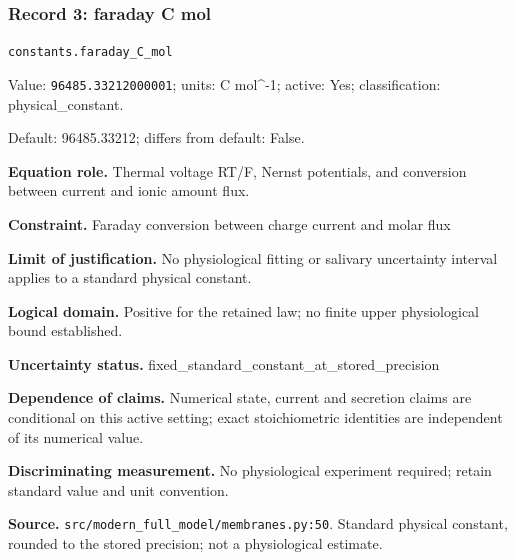 \subsubsection*{Record 3: faraday C mol}
{\small \nolinkurl{constants.faraday_C_mol}\par

Value: \texttt{96485.33212000001}; units: C mol\textasciicircum{}-1; active: Yes; classification: physical\_constant.\par

Default: 96485.33212; differs from default: False.\par

\textbf{Equation role.} Thermal voltage RT/F, Nernst potentials, and conversion between current and ionic amount flux.\par

\textbf{Constraint.} Faraday conversion between charge current and molar flux\par

\textbf{Limit of justification.} No physiological fitting or salivary uncertainty interval applies to a standard physical constant.\par

\textbf{Logical domain.} Positive for the retained law; no finite upper physiological bound established.\par

\textbf{Uncertainty status.} fixed\_standard\_constant\_at\_stored\_precision\par

\textbf{Dependence of claims.} Numerical state, current and secretion claims are conditional on this active setting; exact stoichiometric identities are independent of its numerical value.\par

\textbf{Discriminating measurement.} No physiological experiment required; retain standard value and unit convention.\par

\textbf{Source.} \nolinkurl{src/modern_full_model/membranes.py:50}. Standard physical constant, rounded to the stored precision; not a physiological estimate.\par}

